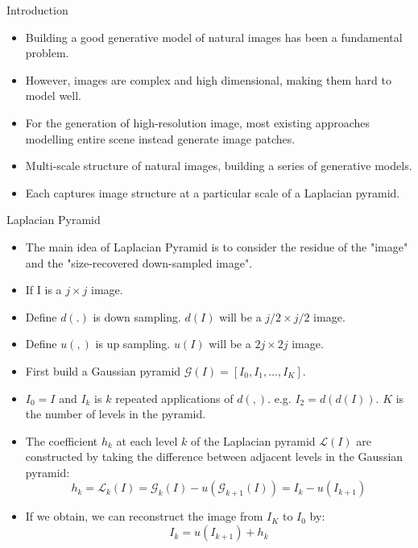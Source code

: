 \documentclass[10pt]{beamer}
\begin{document}
	\begin{frame}{Introduction}
		\begin{itemize}
			\item Building a good generative model of natural images has been a fundamental problem.
			\pause
			\item However, images are complex and high dimensional, making them hard to model well.
			\pause
			\item For the generation of high-resolution image, most existing approaches modelling entire scene instead generate image patches.
			\pause
			\item Multi-scale structure of natural images, building a series of generative models.
			\pause
			\item Each captures image structure at a particular scale of a Laplacian pyramid.
		\end{itemize}
	\end{frame}

	\begin{frame}{Laplacian Pyramid}
		\begin{itemize}
			\pause
			\item The main idea of Laplacian Pyramid is to consider the residue of the "image" and the "size-recovered down-sampled image".
			\pause
			\item If I is a $j\times j$ image.
			\pause
			\item Define $d(.)$ is down sampling. $d(I)$ will be a $j/2\times j/2$ image.
			\pause
			\item Define $u(,)$ is up sampling. $u(I)$ will be a $2j\times 2j$ image.
			\pause
			\item First build a Gaussian pyramid $\mathcal{G}(I)=[I_0,I_1,\dots,I_K]$.
			\pause
			\item $I_0=I$ and $I_k$ is $k$ repeated applications of $d(,)$. e.g. $I_2=d(d(I))$. $K$ is the number of levels in the pyramid.
			\pause
			\item The coefficient $h_k$ at each level $k$ of the Laplacian pyramid $\mathcal{L}(I)$ are constructed by taking the difference between adjacent levels in the Gaussian pyramid:
			\pause
			$$
			h_k=\mathcal{L}_k(I)=\mathcal{G}_k(I)-u(\mathcal{G}_{k+1}(I))=I_k-u(I_{k+1})
			$$
			\pause
			\item If we obtain, we can reconstruct the image from $I_K$ to $I_0$ by:
			\pause
			$$
			I_k=u(I_{k+1})+h_k
			$$
		\end{itemize}
	\end{frame}
\end{document}
